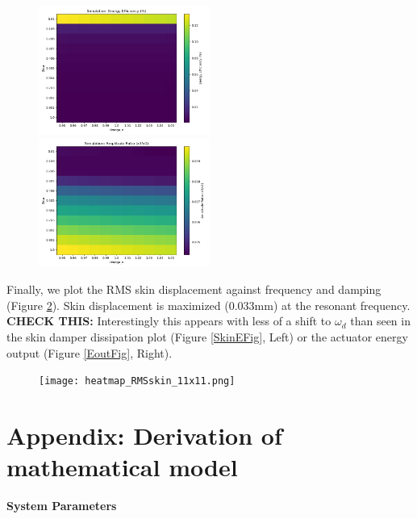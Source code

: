 \documentclass[letterpaper,11pt]{article}
\begin{document}
\begin{figure}[b]
\includegraphics[width=0.5\textwidth]{heatmap_ee_11x11.png}
\includegraphics[width=0.5\textwidth]{heatmap_gain_11x11.png}
\caption{}\label{EEficFig}\label{GainFig}
\end{figure}


Finally, we plot the   RMS skin displacement against frequency and damping (Figure \ref{RMSFig}).
Skin displacement is maximized (0.033mm) at the resonant frequency.   {\bf CHECK THIS:} Interestingly this appears
with less of a shift to $\omega_d$ than seen in the skin damper dissipation plot (Figure \ref{SkinEFig}, Left)
or the actuator energy output (Figure \ref{EoutFig}, Right).

\begin{figure}
\texttt{[image: heatmap\_RMSskin\_11x11.png]}
\caption{}\label{RMSFig}
\end{figure}

\clearpage
\newpage\section*{Appendix: Derivation of mathematical model}
\noindent \textbf{System Parameters}
\end{document}

